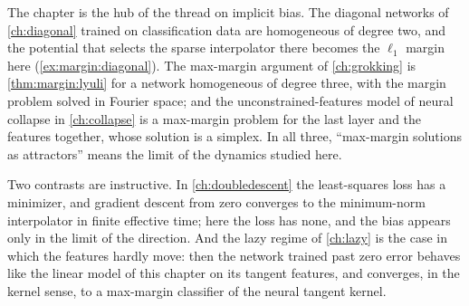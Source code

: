 \begin{refsection}

The chapter is the hub of the thread on implicit bias. The diagonal networks of \cref{ch:diagonal} trained on classification data are homogeneous of degree two, and the potential that selects the sparse interpolator there becomes the $\ell_1$ margin here (\cref{ex:margin:diagonal}). The max-margin argument of \cref{ch:grokking} is \cref{thm:margin:lyuli} for a network homogeneous of degree three, with the margin problem solved in Fourier space; and the unconstrained-features model of neural collapse in \cref{ch:collapse} is a max-margin problem for the last layer and the features together, whose solution is a simplex. In all three, ``max-margin solutions as attractors'' means the limit of the dynamics studied here.

Two contrasts are instructive. In \cref{ch:doubledescent} the least-squares loss has a minimizer, and gradient descent from zero converges to the minimum-norm interpolator in finite effective time; here the loss has none, and the bias appears only in the limit of the direction. And the lazy regime of \cref{ch:lazy} is the case in which the features hardly move: then the network trained past zero error behaves like the linear model of this chapter on its tangent features, and converges, in the kernel sense, to a max-margin classifier of the neural tangent kernel.


\end{refsection}
